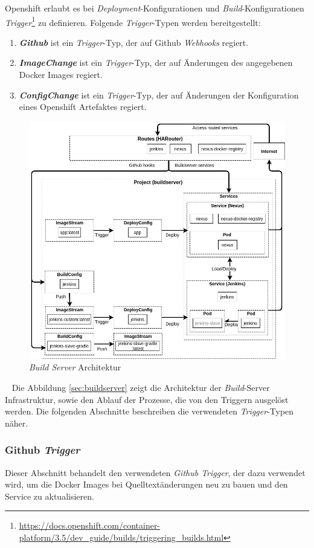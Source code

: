 Openshift erlaubt es bei \emph{Deployment}-Konfigurationen und \emph{Build}-Konfigurationen \emph{Trigger}\footnote{\url{https://docs.openshift.com/container-platform/3.5/dev_guide/builds/triggering_builds.html}} zu definieren. Folgende \emph{Trigger}-Typen werden bereitgestellt:
\begin{enumerate}
	\item\textbf{\emph{Github}} ist ein \emph{Trigger}-Typ, der auf Github \emph{Webhooks} regiert.
	\item\textbf{\emph{ImageChange}} ist ein \emph{Trigger}-Typ, der auf Änderungen des angegebenen Docker Images regiert.
	\item\textbf{\emph{ConfigChange}} ist ein \emph{Trigger}-Typ, der auf Änderungen der Konfiguration eines Openshift Artefaktes regiert.
\end{enumerate}

\begin{figure}[H]
	\centering
	\includegraphics[scale=0.55]{logos/architecture-diagram-buildserver.jpg}
	\caption{\emph{Build Server} Architektur}
	\label{fig:architecture}
\end{figure}
\ \newpage
Die Abbildung \ref{sec:buildserver} zeigt die Architektur der \emph{Build}-Server Infrastruktur, sowie den Ablauf der Prozesse, die von den Triggern ausgelöst werden. Die folgenden Abschnitte beschreiben die verwendeten \emph{Trigger}-Typen näher.
\subsubsection{Github \emph{Trigger}}
Dieser Abschnitt behandelt den verwendeten \emph{Github Trigger}, der dazu verwendet wird, um die Docker Images bei Quelltextänderungen neu zu bauen und den Service zu aktualisieren.\\

